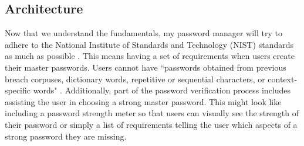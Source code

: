 \documentclass[10pt,twocolumn]{article}
\begin{document}
\subsection{Architecture}
Now that we understand the fundamentals, my password manager will try to adhere to the National Institute of Standards and Technology (NIST) standards as much as possible \cite{grassi_fenton_newton_perlner_regenscheid_burr_richer}. This means having a set of requirements when users create their master passwords. Users cannot have ``passwords obtained from previous breach corpuses, dictionary words, repetitive or sequential characters, or context-specific words" \cite{grassi_fenton_newton_perlner_regenscheid_burr_richer}. Additionally, part of the password verification process includes assisting the user in choosing a strong master password. This might look like including a password strength meter so that users can visually see the strength of their password or simply a list of requirements telling the user which aspects of a strong password they are missing.
\end{document}
